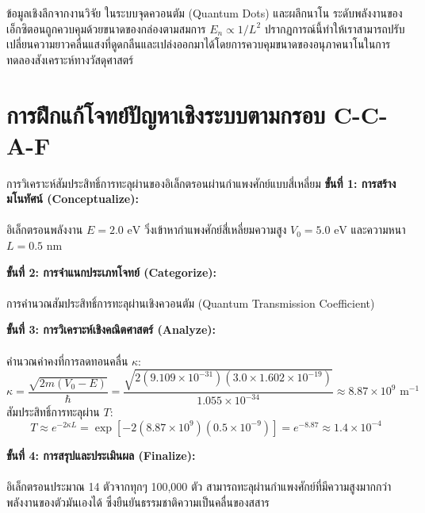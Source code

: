\begin{researchbox}{ข้อมูลเชิงลึกจากงานวิจัย}
ในระบบจุดควอนตัม (Quantum Dots) และผลึกนาโน ระดับพลังงานของเอ็กซิตอนถูกควบคุมด้วยขนาดของกล่องตามสมการ $E_n \propto 1/L^2$ ปรากฏการณ์นี้ทำให้เราสามารถปรับเปลี่ยนความยาวคลื่นแสงที่ดูดกลืนและเปล่งออกมาได้โดยการควบคุมขนาดของอนุภาคนาโนในการทดลองสังเคราะห์ทางวัสดุศาสตร์
\end{researchbox}

\section{การฝึกแก้โจทย์ปัญหาเชิงระบบตามกรอบ C-C-A-F}

\begin{ccafsolution}{การวิเคราะห์สัมประสิทธิ์การทะลุผ่านของอิเล็กตรอนผ่านกำแพงศักย์แบบสี่เหลี่ยม}
\textbf{ขั้นที่ 1: การสร้างมโนทัศน์ (Conceptualize):}\\\\ อิเล็กตรอนพลังงาน $E = 2.0\text{ eV}$ วิ่งเข้าหากำแพงศักย์สี่เหลี่ยมความสูง $V_0 = 5.0\text{ eV}$ และความหนา $L = 0.5\text{ nm}$

\vspace{4pt}
\textbf{ขั้นที่ 2: การจำแนกประเภทโจทย์ (Categorize):}\\\\ การคำนวณสัมประสิทธิ์การทะลุผ่านเชิงควอนตัม (Quantum Transmission Coefficient)

\vspace{4pt}
\textbf{ขั้นที่ 3: การวิเคราะห์เชิงคณิตศาสตร์ (Analyze):}\\\\ คำนวณค่าคงที่การลดทอนคลื่น $\kappa$:
\begin{equation}
\kappa = \frac{\sqrt{2m(V_0 - E)}}{\hbar} = \frac{\sqrt{2(9.109 \times 10^{-31})(3.0 \times 1.602 \times 10^{-19})}}{1.055 \times 10^{-34}} \approx 8.87 \times 10^9\text{ m}^{-1}
\end{equation}
สัมประสิทธิ์การทะลุผ่าน $T$:
\begin{equation}
T \approx e^{-2\kappa L} = \exp\left[-2(8.87 \times 10^9)(0.5 \times 10^{-9})\right] = e^{-8.87} \approx 1.4 \times 10^{-4}
\end{equation}

\vspace{4pt}
\textbf{ขั้นที่ 4: การสรุปและประเมินผล (Finalize):}\\\\ อิเล็กตรอนประมาณ 14 ตัวจากทุกๆ 100,000 ตัว สามารถทะลุผ่านกำแพงศักย์ที่มีความสูงมากกว่าพลังงานของตัวมันเองได้ ซึ่งยืนยันธรรมชาติความเป็นคลื่นของสสาร
\end{ccafsolution}

